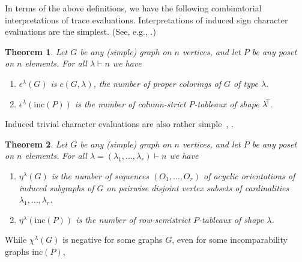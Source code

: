 \documentclass[12pt]{amsart}
\newtheorem{thm}{Theorem}[section]
\numberwithin{equation}{section}
\newcommand{\ssec}[1]{\subsection{#1}{$\negthinspace$}}
\newcommand{\tr}{{\negthickspace \top \negthickspace}}
\newcommand{\inc}{\mathrm{inc}}
\begin{document}
In terms of the above definitions, we have the following
combinatorial interpretations of trace evaluations.
Interpretations of induced sign character evaluations are
the simplest.  (See, e.g., \cite[Eqn.~(3.11)]{SkanCCS}.)
\begin{thm}\label{t:epsilonevals}
  Let $G$ be any (simple) graph on $n$ vertices,
  and let $P$ be any poset on $n$ elements.  For all $\lambda \vdash n$
  we have
  \begin{enumerate}
  \item $\epsilon^\lambda(G)$ is $c(G,\lambda)$, the number of
    proper colorings of $G$ of type $\lambda$.
  \item $\epsilon^\lambda(\inc(P))$ is the number of column-strict
    $P$-tableaux of shape $\lambda^\tr$.
  \end{enumerate}
\end{thm}
\noindent
Induced trivial character evaluations are also rather
simple~\cite[Thm.\,4.7 (ii-b)]{CHSSkanEKL}, \cite[Thm.\,3.7]{SkanCCS}.
\begin{thm}\label{t:etaevals}
  Let $G$ be any (simple) graph on $n$ vertices,
  and let $P$ be any poset on $n$ elements.
  For all $\lambda  = (\lambda_1,\dotsc, \lambda_r) \vdash n$
  we have
  \begin{enumerate}
  \item $\eta^\lambda(G)$ is the number of sequences $(O_1,\dotsc,O_r)$
    of acyclic orientations of
    induced subgraphs
    of $G$ on pairwise disjoint vertex
    subsets of cardinalities $\lambda_1,\dotsc,\lambda_r$.
  \item $\eta^\lambda(\inc(P))$ is the number of row-semistrict
    $P$-tableaux of shape $\lambda$.
  \end{enumerate}
\end{thm}
\noindent 
While $\chi^\lambda(G)$ is negative for some graphs $G$,
even for some incomparability graphs $\inc(P)$,
\end{document}
